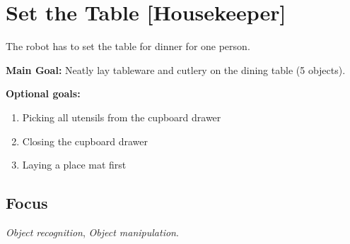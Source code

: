\section{Set the Table [Housekeeper]}
\label{test:set-the-table}
The robot has to set the table for dinner for one person.


\noindent \textbf{Main Goal:} Neatly lay tableware and cutlery on the dining table (5 objects).

\noindent \textbf{Optional goals:}
\begin{enumerate}[nosep]
	\item Picking all utensils from the cupboard drawer
	\item Closing the cupboard drawer
	\item Laying a place mat first
\end{enumerate}

\subsection*{Focus}
\emph{Object recognition}, \emph{Object manipulation}.

%


